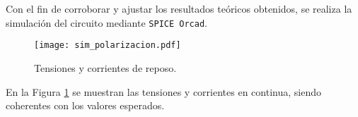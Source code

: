 Con el fin de corroborar y ajustar los resultados teóricos obtenidos, se realiza la simulación del circuito mediante \texttt{SPICE Orcad}.

\begin{figure}[H]
	\centering
	\texttt{[image: sim\_polarizacion.pdf]}
	\caption{Tensiones y corrientes de reposo.}
	\label{fig:sim_pol}
\end{figure}


En la Figura \ref{fig:sim_pol} se muestran las tensiones y corrientes en continua, siendo coherentes con los valores esperados.

